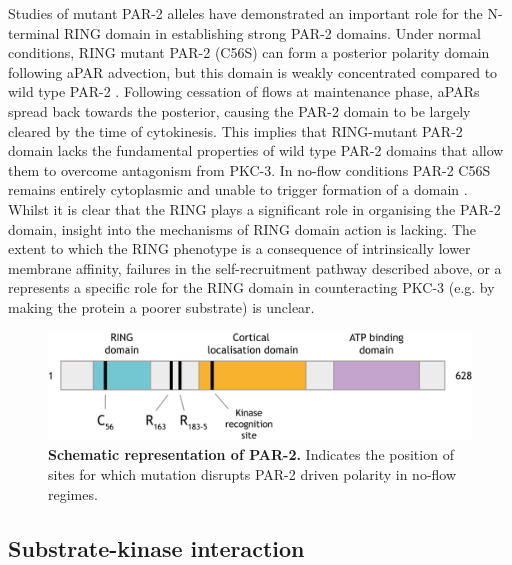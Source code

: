 \documentclass[12pt]{"report"}
\newcommand{\mycaption}[2]{\caption[#1]{\textbf{#1.} #2}}
\begin{document}
Studies of mutant PAR-2 alleles have demonstrated an important role for the N-terminal RING domain in establishing strong PAR-2 domains. Under normal conditions, RING mutant PAR-2 (C56S) can form a posterior polarity domain following aPAR advection, but this domain is weakly concentrated compared to wild type PAR-2 \citep{Hao2006}. Following cessation of flows at maintenance phase, aPARs spread back towards the posterior, causing the PAR-2 domain to be largely cleared by the time of cytokinesis. This implies that RING-mutant PAR-2 domain lacks the fundamental properties of wild type PAR-2 domains that allow them to overcome antagonism from PKC-3. In no-flow conditions PAR-2 C56S remains entirely cytoplasmic and unable to trigger formation of a domain \citep{Motegi2011}. Whilst it is clear that the RING plays a significant role in organising the PAR-2 domain, insight into the mechanisms of RING domain action is lacking. The extent to which the RING phenotype is a consequence of intrinsically lower membrane affinity, failures in the self-recruitment pathway described above, or a represents a specific role for the RING domain in counteracting PKC-3 (e.g. by making the protein a poorer substrate) is unclear.\\

\begin{figure}
\includegraphics[scale=0.95]{par2_schematic}
\centering
\mycaption{Schematic representation of PAR-2}{
Indicates the position of sites for which mutation disrupts PAR-2 driven polarity in no-flow regimes.
}
\label{fig:par2_schematic}
\end{figure}

\subsection{Substrate-kinase interaction}
\end{document}
